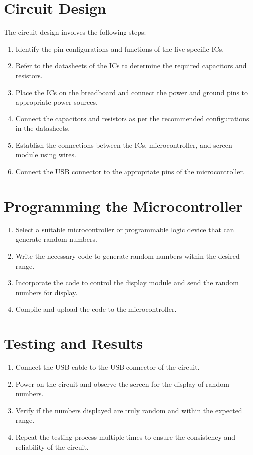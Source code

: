 \documentclass{article}
\begin{document}
\section{Circuit Design}
The circuit design involves the following steps:
\begin{enumerate}
  \item Identify the pin configurations and functions of the five specific ICs.
  \item Refer to the datasheets of the ICs to determine the required capacitors and resistors.
  \item Place the ICs on the breadboard and connect the power and ground pins to appropriate power sources.
  \item Connect the capacitors and resistors as per the recommended configurations in the datasheets.
  \item Establish the connections between the ICs, microcontroller, and screen module using wires.
  \item Connect the USB connector to the appropriate pins of the microcontroller.
\end{enumerate}

\section{Programming the Microcontroller}
\begin{enumerate}
  \item Select a suitable microcontroller or programmable logic device that can generate random numbers.
  \item Write the necessary code to generate random numbers within the desired range.
  \item Incorporate the code to control the display module and send the random numbers for display.
  \item Compile and upload the code to the microcontroller.
\end{enumerate}

\section{Testing and Results}
\begin{enumerate}
  \item Connect the USB cable to the USB connector of the circuit.
  \item Power on the circuit and observe the screen for the display of random numbers.
  \item Verify if the numbers displayed are truly random and within the expected range.
  \item Repeat the testing process multiple times to ensure the consistency and reliability of the circuit.
\end{enumerate}
\end{document}
